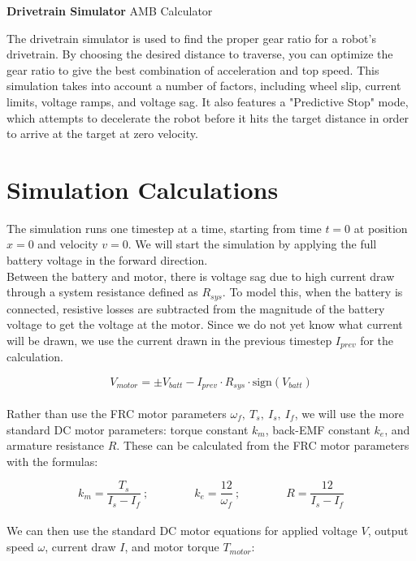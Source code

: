 \documentclass[a4paper]{article}
\begin{document}
	
	\Huge\textbf{Drivetrain Simulator}
	\newline
	\LARGE AMB Calculator
	
	\vspace{0.5cm}
	\normalsize
	
	The drivetrain simulator is used to find the proper gear ratio for a robot's drivetrain. By choosing the desired distance to traverse, you can optimize the gear ratio to give the best combination of acceleration and top speed. This simulation takes into account a number of factors, including wheel slip, current limits, voltage ramps, and voltage sag. It also features a "Predictive Stop" mode, which attempts to decelerate the robot before it hits the target distance in order to arrive at the target at zero velocity.
	
	\section*{Simulation Calculations}
	
	The simulation runs one timestep at a time, starting from time $ t=0 $ at position $ x=0 $ and velocity $ v=0 $. We will start the simulation by applying the full battery voltage in the forward direction. \\
	
	Between the battery and motor, there is voltage sag due to high current draw through a system resistance defined as $ R_{sys} $. To model this, when the battery is connected, resistive losses are subtracted from the magnitude of the battery voltage to get the voltage at the motor. Since we do not yet know what current will be drawn, we use the current drawn in the previous timestep $ I_{prev} $ for the calculation.
	
	\begin{equation}
		V_{motor} = \pm V_{batt} - I_{prev} \cdot R_{sys} \cdot \text{sign} \left( V_{batt} \right)
	\end{equation}
	\\
	Rather than use the FRC motor parameters $ \omega_f,\ T_s,\ I_s,\ I_f $, we will use the more standard DC motor parameters: torque constant $ k_m $, back-EMF constant $ k_e $, and armature resistance $ R $. These can be calculated from the FRC motor parameters with the formulas:
	
	\begin{equation}
		k_m = \frac{T_s}{I_s - I_f}\ ; \qquad\qquad
		k_e = \frac{12}{\omega_f}\ ; \qquad\qquad
		R = \frac{12}{I_s - I_f}
	\end{equation}
	\\
	We can then use the standard DC motor equations for applied voltage $ V $, output speed $ \omega $, current draw $ I $, and motor torque $ T_{motor} $:
	
\end{document}
